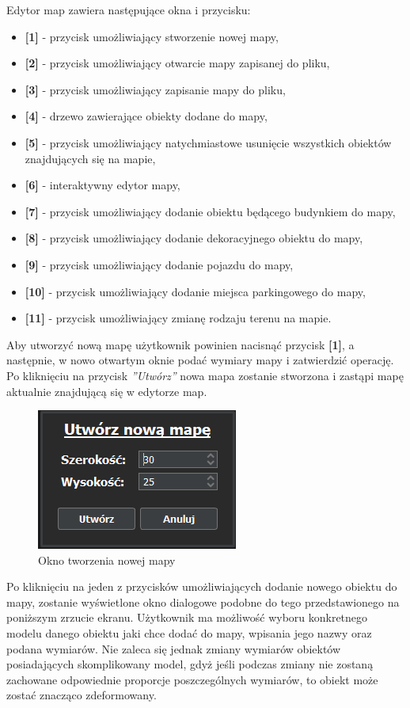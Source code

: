 \documentclass[a4paper,11pt,twoside]{report}
\theoremstyle{definition}
\begin{document}
Edytor map zawiera następujące okna i przycisku:
\begin{itemize}
	\item \textbf{[1]} - przycisk umożliwiający stworzenie nowej mapy,
	\item \textbf{[2]} - przycisk umożliwiający otwarcie mapy zapisanej do pliku,
	\item \textbf{[3]} - przycisk umożliwiający zapisanie mapy do pliku,
	\item \textbf{[4]} - drzewo zawierające obiekty dodane do mapy,
	\item \textbf{[5]} - przycisk umożliwiający natychmiastowe usunięcie wszystkich obiektów znajdujących się na mapie,
	\item \textbf{[6]} - interaktywny edytor mapy,
	\item \textbf{[7]} - przycisk umożliwiający dodanie obiektu będącego budynkiem do mapy,
	\item \textbf{[8]} - przycisk umożliwiający dodanie dekoracyjnego obiektu do mapy,
	\item \textbf{[9]} - przycisk umożliwiający dodanie pojazdu do mapy,
	\item \textbf{[10]} - przycisk umożliwiający dodanie miejsca parkingowego do mapy,
	\item \textbf{[11]} - przycisk umożliwiający zmianę rodzaju terenu na mapie.
\end{itemize}

Aby utworzyć nową mapę użytkownik powinien nacisnąć przycisk \textbf{[1]}, a następnie, w nowo otwartym oknie podać wymiary mapy i zatwierdzić operację. Po kliknięciu na przycisk \textit{''Utwórz''} nowa mapa zostanie stworzona i zastąpi mapę aktualnie znajdującą się w edytorze map.

\begin{figure}[h!]
\centering
\includegraphics[scale=1.0]{instructionCreateMap}
\caption[Okno tworzenia nowej mapy]{Okno tworzenia nowej mapy}
\end{figure}

Po kliknięciu na jeden z przycisków umożliwiających dodanie nowego obiektu do mapy, zostanie wyświetlone okno dialogowe podobne do tego przedstawionego na poniższym zrzucie ekranu. Użytkownik ma możliwość wyboru konkretnego modelu danego obiektu jaki chce dodać do mapy, wpisania jego nazwy oraz podana wymiarów. Nie zaleca się jednak zmiany wymiarów obiektów posiadających skomplikowany model, gdyż jeśli podczas zmiany nie zostaną zachowane odpowiednie proporcje poszczególnych wymiarów, to obiekt może zostać znacząco zdeformowany.
\end{document}
